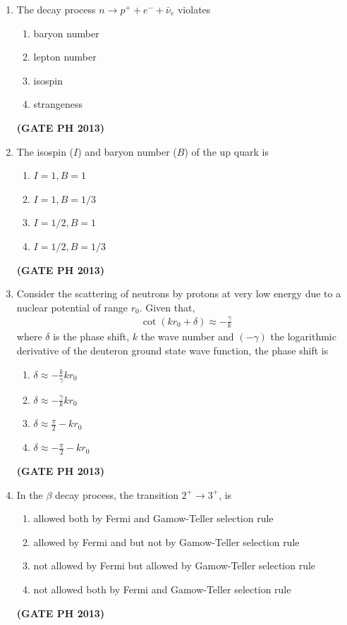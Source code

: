 \documentclass[14pt, a4paper]{extarticle}
\begin{document}
\begin{enumerate}[label=\textbf{Q. \arabic*}]
\item The decay process $n \to p^+ + e^- + \bar{\nu}_e$ violates
\begin{multicols}{2}
    \begin{enumerate}
        \item baryon number
        \item lepton number
        \item isospin
        \item strangeness
    \end{enumerate}
\end{multicols}
\hfill \textbf{(GATE PH 2013)}

\item The isospin ($I$) and baryon number ($B$) of the up quark is
\begin{multicols}{2}
    \begin{enumerate}
        \item $I=1, B=1$
        \item $I=1, B=1/3$
        \item $I=1/2, B=1$
        \item $I=1/2, B=1/3$
    \end{enumerate}
\end{multicols}
\hfill \textbf{(GATE PH 2013)}

\item Consider the scattering of neutrons by protons at very low energy due to a nuclear potential of range $r_0$. Given that,
\begin{align*}
    \cot(kr_0 + \delta) \approx -\frac{\gamma}{k}
\end{align*}
where $\delta$ is the phase shift, $k$ the wave number and $(-\gamma)$ the logarithmic derivative of the deuteron ground state wave function, the phase shift is
\begin{multicols}{4}
    \begin{enumerate}
        \item $\delta \approx -\frac{k}{\gamma} kr_0$
        \item $\delta \approx -\frac{\gamma}{k} kr_0$
        \item $\delta \approx \frac{\pi}{2} - kr_0$
        \item $\delta \approx -\frac{\pi}{2} - kr_0$
    \end{enumerate}
\end{multicols}
\hfill \textbf{(GATE PH 2013)}

\item In the $\beta$ decay process, the transition $2^+ \to 3^+$, is
\begin{enumerate}
    \item allowed both by Fermi and Gamow-Teller selection rule
    \item allowed by Fermi and but not by Gamow-Teller selection rule
    \item not allowed by Fermi but allowed by Gamow-Teller selection rule
    \item not allowed both by Fermi and Gamow-Teller selection rule
\end{enumerate}
\hfill \textbf{(GATE PH 2013)}


\end{enumerate}
\end{document}
